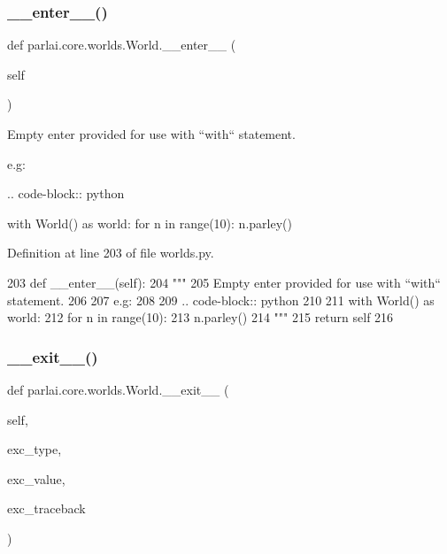 \subsubsection{\texorpdfstring{\+\_\+\+\_\+enter\+\_\+\+\_\+()}{\_\_enter\_\_()}}
{\footnotesize\ttfamily def parlai.\+core.\+worlds.\+World.\+\_\+\+\_\+enter\+\_\+\+\_\+ (\begin{DoxyParamCaption}\item[{}]{self }\end{DoxyParamCaption})}

\begin{DoxyVerb}Empty enter provided for use with ``with`` statement.

e.g:

.. code-block:: python

    with World() as world:
for n in range(10):
    n.parley()
\end{DoxyVerb}
 

Definition at line 203 of file worlds.\+py.


\begin{DoxyCode}
203     \textcolor{keyword}{def }\_\_enter\_\_(self):
204         \textcolor{stringliteral}{"""}
205 \textcolor{stringliteral}{        Empty enter provided for use with ``with`` statement.}
206 \textcolor{stringliteral}{}
207 \textcolor{stringliteral}{        e.g:}
208 \textcolor{stringliteral}{}
209 \textcolor{stringliteral}{        .. code-block:: python}
210 \textcolor{stringliteral}{}
211 \textcolor{stringliteral}{            with World() as world:}
212 \textcolor{stringliteral}{                for n in range(10):}
213 \textcolor{stringliteral}{                    n.parley()}
214 \textcolor{stringliteral}{        """}
215         \textcolor{keywordflow}{return} self
216 
\end{DoxyCode}
\mbox{\label{classparlai_1_1core_1_1worlds_1_1World_ae2b8ea006564cbefbe8520f45fb71040}} 
\subsubsection{\texorpdfstring{\+\_\+\+\_\+exit\+\_\+\+\_\+()}{\_\_exit\_\_()}}
{\footnotesize\ttfamily def parlai.\+core.\+worlds.\+World.\+\_\+\+\_\+exit\+\_\+\+\_\+ (\begin{DoxyParamCaption}\item[{}]{self,  }\item[{}]{exc\+\_\+type,  }\item[{}]{exc\+\_\+value,  }\item[{}]{exc\+\_\+traceback }\end{DoxyParamCaption})}

